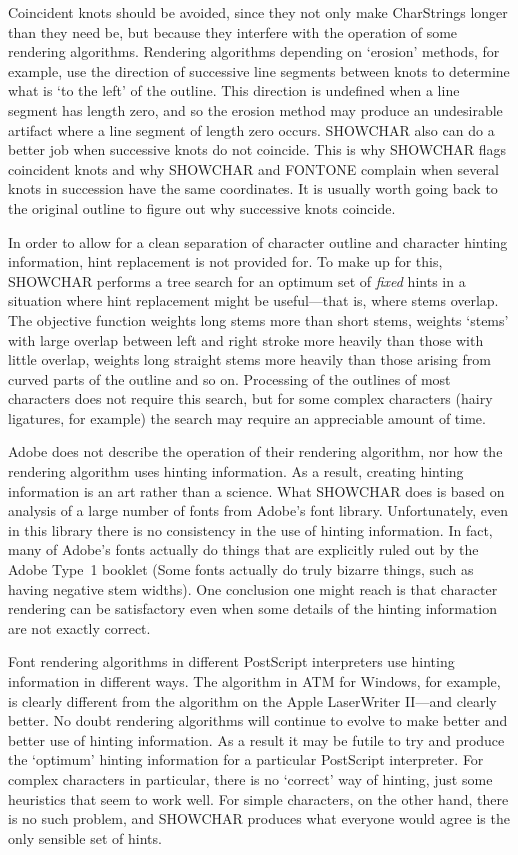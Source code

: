 \bpar Coincident knots should be avoided, since they not only make
CharStrings longer than they need be, but because they interfere with
the operation of some rendering algorithms.  
Rendering algorithms depending on `erosion' methods, for example, use the
direction of successive line segments between knots to determine what is
`to the left' of the outline.
This direction is undefined when a line segment has length zero, and so
the erosion method may produce an undesirable artifact where a line
segment of length zero occurs.
SHOWCHAR also can do a better job when successive knots do not coincide.
This is why SHOWCHAR flags coincident knots and why SHOWCHAR and
FONTONE complain when several knots in succession have the same coordinates.
It is usually worth going back to the original outline to figure out
why successive knots coincide.

\bpar In order to allow for a clean separation of character outline and
character hinting information, hint replacement is not provided for.
To make up for this, SHOWCHAR performs a tree search for an optimum 
set of {\it fixed} hints in a situation where hint replacement might be
useful---that is, where stems overlap.
The objective function weights long stems more than short
stems, weights `stems' with large overlap between left and right stroke
more heavily than those with little overlap, weights long straight
stems more heavily than those arising from curved parts of the outline
and so on.
Processing of the outlines of most characters does not require this
search, 
but for some complex characters (hairy ligatures, for example) 
the search may require an appreciable amount of time.

\bpar Adobe does not describe the operation of their rendering
algorithm, nor how the rendering algorithm uses hinting information.  
As a result, creating hinting information is an art rather than a science.
What SHOWCHAR does is based on analysis of a large number of fonts from
Adobe's font library.
Unfortunately, even in this library there is no consistency in the use
of hinting information.
In fact, many of Adobe's fonts actually do things that are explicitly
ruled out by the Adobe Type~1 booklet
(Some fonts actually do truly bizarre things, such as having negative
stem widths).
One conclusion one might reach is that character rendering can be
satisfactory even when some details of the hinting information are not
exactly correct.

\bpar Font rendering algorithms in different PostScript interpreters
use hinting information in different ways.
The algorithm in ATM for Windows, for example, is clearly different
from the algorithm on the Apple LaserWriter II---and clearly better.
No doubt rendering algorithms will continue to evolve to make better
and better use of hinting information.
As a result it may be futile to try and produce the `optimum'
hinting information for a particular PostScript interpreter.
For complex characters in particular, there is no `correct' way of
hinting, just some heuristics that seem to work well.
For simple characters, on the other hand, there is no such problem, 
and SHOWCHAR produces what everyone would agree is the only
sensible set of hints.

